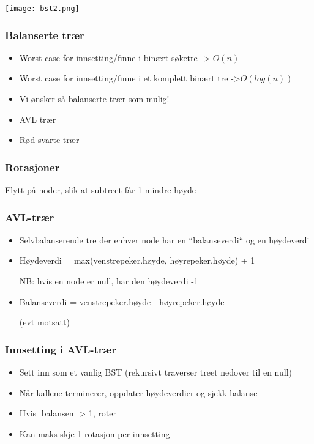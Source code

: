 \documentclass[norsk, handout]{beamer}
\begin{document}
    \begin{frame}
        \texttt{[image: bst2.png]}
    \end{frame}

    \begin{frame}
        \frametitle{Balanserte trær}
        \begin{itemize}
            \item Worst case for innsetting/finne i binært søketre {\pause} -> $O(n)$
            \item Worst case for innsetting/finne i et komplett binært tre
                {\pause} ->$O(log(n))$
            \item Vi ønsker så balanserte trær som mulig!

            \pause
            \item AVL trær
            \item Rød-svarte trær
        \end{itemize}
    \end{frame}

    \begin{frame}
        \frametitle{Rotasjoner}
        Flytt på noder, slik at subtreet får 1 mindre høyde
    \end{frame}

    \begin{frame}
        \frametitle{AVL-trær}
        \begin{itemize}
            \item Selvbalanserende tre der enhver node har en ``balanseverdi`` og en
                høydeverdi
                
            \item Høydeverdi = max(venstrepeker.høyde, høyrepeker.høyde) + 1

                NB: hvis en node er null, har den høydeverdi -1 


            \item Balanseverdi = venstrepeker.høyde - høyrepeker.høyde

                (evt motsatt)
        \end{itemize}
    \end{frame}

    \begin{frame}
        \frametitle{Innsetting i AVL-trær}

        \begin{itemize}
            \item Sett inn som et vanlig BST 
                (rekursivt traverser treet nedover til en null)
            \item Når kallene terminerer, oppdater høydeverdier og sjekk balanse
            \item Hvis |balansen| > 1, roter
            \item Kan maks skje 1 rotasjon per innsetting
        \end{itemize}
    \end{frame}
\end{document}
